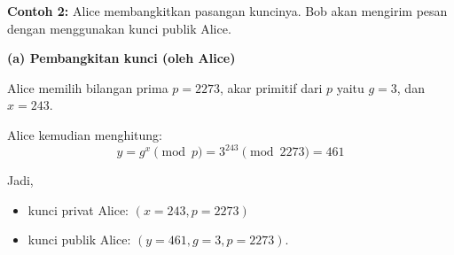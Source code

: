 \documentclass{article}
\begin{document}

\textbf{Contoh 2:} Alice membangkitkan pasangan kuncinya. Bob akan mengirim pesan dengan menggunakan kunci publik Alice.

\textbf{(a) Pembangkitan kunci (oleh Alice)}

Alice memilih bilangan prima $p = 2273$, akar primitif dari $p$ yaitu $g = 3$, dan $x = 243$.

Alice kemudian menghitung:
\[ y = g^x \pmod{p} = 3^{243} \pmod{2273} = 461 \]

Jadi,

\begin{itemize}
    \item kunci privat Alice: $(x = 243, p = 2273)$
    \item kunci publik Alice: $(y = 461, g = 3, p = 2273)$.
\end{itemize}
\end{document}
